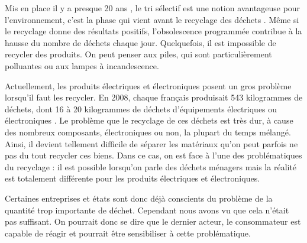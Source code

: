 \bigbreak
Mis en place il y a presque 20 ans , le tri sélectif est une notion avantageuse pour l’environnement, c'est la phase qui vient avant le recyclage des déchets \cite{tri}. Même si le recyclage donne des résultats positifs, l’obsolescence programmée contribue à la hausse du nombre de déchets chaque jour. Quelquefois, il est impossible de recycler des produits. On peut penser aux piles, qui sont particulièrement polluantes ou aux lampes à incandescence.

Actuellement, les produits électriques et électroniques posent un gros problème lorsqu'il faut les recycler. En 2008, chaque français produisait 543 kilogrammes de déchets, dont 16 à 20 kilogrammes de déchets d’équipements électriques ou électroniques \cite{opSsg}. Le problème que le recyclage de ces déchets est très dur, à cause des nombreux composants, électroniques ou non, la plupart du temps mélangé. Ainsi, il devient tellement difficile de séparer les matériaux qu'on peut parfois ne pas du tout recycler ces biens. Dans ce cas, on est face à l'une des problématiques du recyclage : il est possible lorsqu'on parle des déchets ménagers mais la réalité est totalement différente pour les produits électriques et électroniques. 


\bigbreak
Certaines entreprises et états sont donc déjà conscients du problème de la quantité trop importante de déchet. Cependant nous avons vu que cela n'était pas suffisant. On pourrait donc se dire que le dernier acteur, le consommateur est capable de réagir et pourrait être sensibiliser à cette problématique.